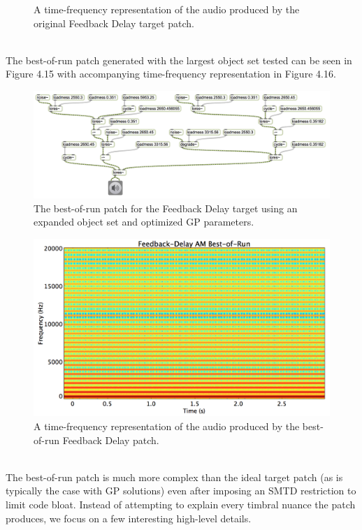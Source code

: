 \documentclass[a4paper,12pt]{report} 	%
\numberwithin{figure}{chapter}
\numberwithin{table}{chapter}
\numberwithin{equation}{chapter}
\begin{document}
\begin{flushleft}
\begin{figure}[h!]
\begin{center}
\caption[Original Feedback Delay Time-Frequency Representation]{A time-frequency representation of the audio produced by the original Feedback Delay target patch.}
\end{center}
\end{figure}
\\
The best-of-run patch generated with the largest object set tested can be seen in Figure 4.15 with accompanying time-frequency representation in Figure 4.16.
\begin{figure}[h!]
\begin{center}
\includegraphics[angle=270, scale=0.60]{DelayFeedbackAM_Best}
\caption[Feedback Delay Best-of-Run Patch]{The best-of-run patch for the Feedback Delay target using an expanded object set and optimized GP parameters.}
\end{center}
\end{figure}
\begin{figure}[h!]
\begin{center}
\includegraphics[scale=0.35,width=\linewidth]{FeedbackDelayAMBestOfRunSTFT}
\caption[Best-of-Run Feedback Delay Time-Frequency Representation]{A time-frequency representation of the audio produced by the best-of-run Feedback Delay patch.}
\end{center}
\end{figure}
\\
The best-of-run patch is much more complex than the ideal target patch (as is typically the case with GP solutions) even after imposing an SMTD restriction to limit code bloat. Instead of attempting to explain every timbral nuance the patch produces, we focus on a few interesting high-level details.


\end{flushleft}
\end{document}
